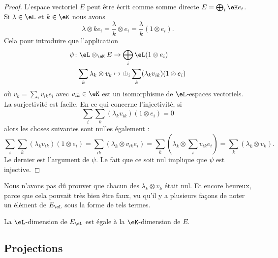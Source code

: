 \begin{proof}
    L'espace vectoriel \( E\) peut être écrit comme somme directe \( E=\bigoplus_i\eK e_i\). Si \( \lambda\in \eL\) et \( k\in \eK\) nous avons
    \begin{equation}
        \lambda\otimes ke_i=\frac{ \lambda }{ k }\otimes e_i=\frac{ \lambda }{ k }(1\otimes e_i).
    \end{equation}
    Cela pour introduire que l'application
    \begin{equation}
        \begin{aligned}
            \psi\colon \eL\otimes_{\eK}E&\to \bigoplus_i\eL(1\otimes e_i) \\
            \sum_k \lambda_k\otimes v_k&\mapsto \oplus_i \sum_k(\lambda_k v_{ik})(1\otimes e_i)
        \end{aligned}
    \end{equation}
    où \( v_k=\sum_i v_{ik}e_i\) avec \( v_{ik}\in \eK\) est un isomorphisme de \( \eL\)-espaces vectoriels. La surjectivité est facile. En ce qui concerne l'injectivité, si
    \begin{equation}
        \sum_i\sum_k(\lambda_kv_{ik})(1\otimes e_i)=0
    \end{equation}
    alors les choses suivantes sont nulles également :
    \begin{equation}
        \sum_i\sum_k(\lambda_kv_{ik})(1\otimes e_i)=\sum_{ik}(\lambda_k\otimes v_{ik}e_i)=\sum_k(\lambda_k\otimes \sum_iv_{ik}e_i)=\sum_k(\lambda_k\otimes v_k).
    \end{equation}
    Le dernier est l'argument de \( \psi\). Le fait que ce soit nul implique que \( \psi\) est injective.
\end{proof}

\begin{remark}
    Nous n'avons pas dû prouver que chacun des \( \lambda_k\otimes v_k\) était nul. Et encore heureux, parce que cela pouvait très bien être faux, vu qu'il y a plusieurs façons de noter un élément de \( E_{\eL}\) sous la forme de tels termes.
\end{remark}

\begin{corollary}       \label{CORooTQGHooIKhNtr}
    La \( \eL\)-dimension de \( E_{\eL}\) est égale à la \( \eK\)-dimension de \( E\).
\end{corollary}

\subsection{Projections}

